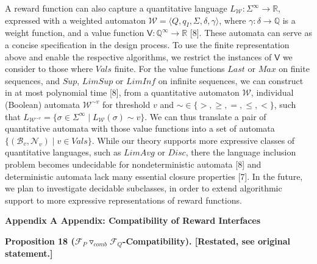 A reward function can also capture a quantitative language $L_{\mathcal{W}}:\Sigma^{\infty}\to\mathbb{R}$, expressed with a weighted automaton $\mathcal{W}=\langle Q,q_{I},\Sigma,\delta,\gamma\rangle$, where $\gamma:\delta\to\mathbb{Q}$ is a weight function, and a value function $\mathsf{V}:\mathbb{Q}^{\infty}\to\mathbb{R}$ [8]. These automata can serve as a concise specification in the design process. To use the finite representation above and enable the respective algorithms, we restrict the instances of $\mathsf{V}$ we consider to those where $\mathit{Vals}$ finite. For the value functions $\mathit{Last}$ or $\mathit{Max}$ on finite sequences, and $\mathit{Sup}$, $\mathit{LimSup}$ or $\mathit{LimInf}$ on infinite sequences, we can construct in at most polynomial time [8], from a quantitative automaton $\mathcal{W}$, individual (Boolean) automata $\mathcal{W}^{\sim v}$ for threshold $v$ and $\sim\in\{>,\geq,=,\leq,<\}$, such that $L_{\mathcal{W}^{\sim v}}=\{\sigma\in\Sigma^{\infty}\mid L_{\mathcal{W}}(\sigma)\sim v\}$. We can thus translate a pair of quantitative automata with those value functions into a set of automata $\{(\mathcal{B}_{v},\mathcal{N}_{v})\mid v\in\mathit{Vals}\}$. While our theory supports more expressive classes of quantitative languages, such as $\mathit{LimAvg}$ or $\mathit{Disc}$, there the language inclusion problem becomes undecidable for nondeterministic automata [8] and deterministic automata lack many essential closure properties [7]. In the future, we plan to investigate decidable subclasses, in order to extend algorithmic support to more expressive representations of reward functions.\par
 
 
 


 
\par\medskip\noindent\textbf{Appendix A Appendix: Compatibility of Reward Interfaces}\par
 
 
 
\par\medskip\noindent\textbf{Proposition 18 (${{\mathcal{F}_{P}}\mathbin{\triangledown_{\mathit{comb}}}{\mathcal{F}_{Q}}}$-Compatibility). [Restated, see original statement.]}\par
 
 

